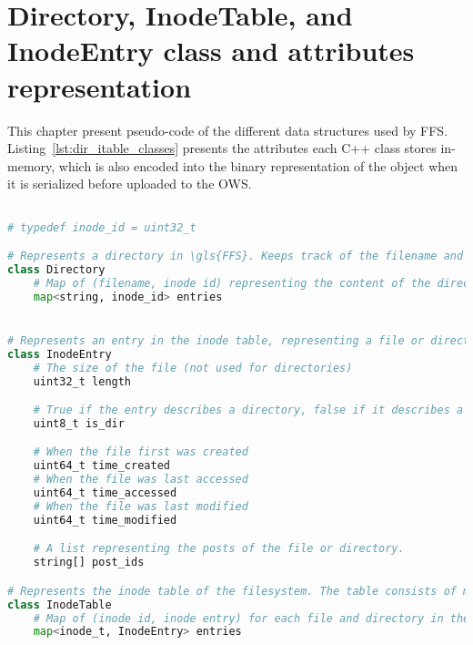 \chapter{Directory, InodeTable, and InodeEntry class and attributes representation}
This chapter present \mbox{pseudo-code} of the different data structures used by \gls{FFS}. Listing~\ref{lst:dir_itable_classes} presents the attributes each C++ class stores \mbox{in-memory}, which is also encoded into the binary representation of the object when it is serialized before uploaded to the \gls{OWS}.

\label{app:inode_dir_code}
\begin{lstlisting}[language=python, caption={The attributes classes representing directories and the inode table in \gls{FFS}}, label=lst:dir_itable_classes,breaklines=true]

# typedef inode_id = uint32_t

# Represents a directory in \gls{FFS}. Keeps track of the filename and inode of each file
class Directory
	# Map of (filename, inode id) representing the content of the directory
	map<string, inode_id> entries


# Represents an entry in the inode table, representing a file or directory
class InodeEntry
	# The size of the file (not used for directories) 
	uint32_t length

	# True if the entry describes a directory, false if it describes a file
	uint8_t is_dir

	# When the file first was created
	uint64_t time_created
	# When the file was last accessed
	uint64_t time_accessed
	# When the file was last modified
	uint64_t time_modified

	# A list representing the posts of the file or directory. 
	string[] post_ids

# Represents the inode table of the filesystem. The table consists of multiple inode entries
class InodeTable
	# Map of (inode id, inode entry) for each file and directory in the filesystem
	map<inode_t, InodeEntry> entries

\end{lstlisting}